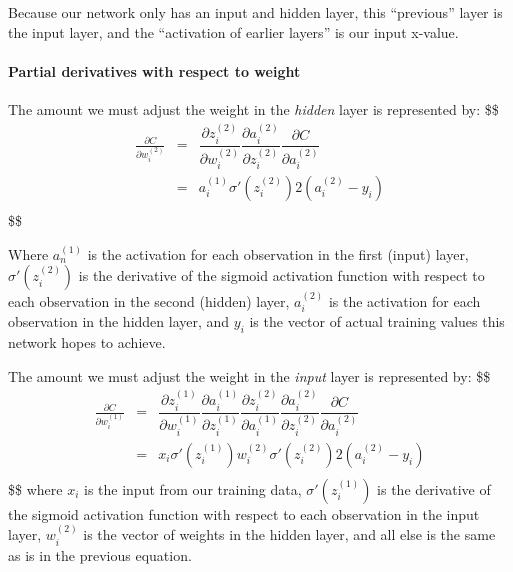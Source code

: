 \documentclass[
]{article}
\begin{document}
Because our network only has an input and hidden layer, this
``previous'' layer is the input layer, and the ``activation of earlier
layers'' is our input x-value.

\hypertarget{partial-derivatives-with-respect-to-weight}{%
\paragraph{Partial derivatives with respect to
weight}\label{partial-derivatives-with-respect-to-weight}}

The amount we must adjust the weight in the \emph{hidden} layer is
represented by: \$\$ \begin{eqnarray}
\frac{\partial{C}}{\partial{w_i^{(2)}}}    &=&  \dfrac{\partial{z_i^{(2)}}}{\partial{w_i^{(2)}}}
     \dfrac{\partial{a_i^{(2)}}}{\partial{z_i^{(2)}}}
     \dfrac{\partial{C}}{\partial{a_i^{(2)}}} \\
     
 &=& a_i^{(1)} \sigma'(z_i^{(2)}) 2(a_i^{(2)}-y_i) \\
\end{eqnarray} \$\$

Where \(a_n^{(1)}\) is the activation for each observation in the first
(input) layer, \(\sigma'(z_i^{(2)})\) is the derivative of the sigmoid
activation function with respect to each observation in the second
(hidden) layer, \(a_i^{(2)}\) is the activation for each observation in
the hidden layer, and \(y_i\) is the vector of actual training values
this network hopes to achieve.

The amount we must adjust the weight in the \emph{input} layer is
represented by: \$\$ \begin{eqnarray}
\frac{\partial{C}}{\partial{w_i^{(1)}}}    &=& \dfrac{\partial{z_i^{(1)}}}{\partial{w_i^{(1)}}} \dfrac{\partial{a_i^{(1)}}}{\partial{z_i^{(1)}}}  \dfrac{\partial{z_i^{(2)}}}{\partial{a_i^{(1)}}}
     \dfrac{\partial{a_i^{(2)}}}{\partial{z_i^{(2)}}}
     \dfrac{\partial{C}}{\partial{a_i^{(2)}}} \\
     
&=& x_i \sigma'(z_i^{(1)}) w_i^{(2)} \sigma'(z_i^{(2)}) 2(a_i^{(2)}-y_i) \\

\end{eqnarray} \$\$ where \(x_i\) is the input from our training data,
\(\sigma'(z_i^{(1)})\) is the derivative of the sigmoid activation
function with respect to each observation in the input layer,
\(w_i^{(2)}\) is the vector of weights in the hidden layer, and all else
is the same as is in the previous equation.
\end{document}
